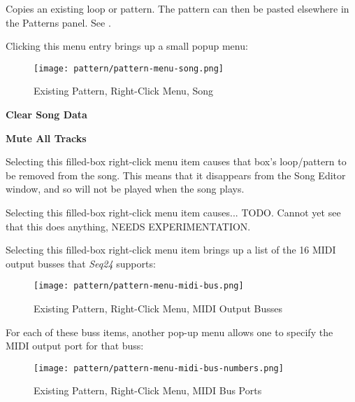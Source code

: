    Copies an existing loop or pattern.
   The pattern can then be pasted elsewhere in the Patterns panel.
   See .

   Clicking this menu entry brings up a small popup menu:

\begin{figure}[H]
   \centering 
   \texttt{[image: pattern/pattern-menu-song.png]}
   \caption{Existing Pattern, Right-Click Menu, Song}
   \label{fig:pattern_window_right_click_song}
\end{figure}

   \begin{enumber}
      \item \textbf{Clear Song Data}
      \item \textbf{Mute All Tracks}
   \end{enumber}

   \setcounter{ItemCounter}{0}      %

   Selecting this filled-box right-click menu item causes that box's
   loop/pattern to be removed from the song.  This means
   that it disappears from the Song Editor window, and so will not
   be played when the song plays.

   Selecting this filled-box right-click menu item causes...
   TODO.  
   Cannot yet see that this does anything, NEEDS EXPERIMENTATION.

   Selecting this filled-box right-click menu item brings up a list
   of the 16 MIDI output busses that \textsl{Seq24} supports:

\begin{figure}[H]
   \centering 
   \texttt{[image: pattern/pattern-menu-midi-bus.png]}
   \caption{Existing Pattern, Right-Click Menu, MIDI Output Busses}
   \label{fig:pattern_window_right_click_midi_bus}
\end{figure}

   For each of these buss items, another pop-up menu allows one
   to specify the MIDI output port for that buss:

\begin{figure}[H]
   \centering 
   \texttt{[image: pattern/pattern-menu-midi-bus-numbers.png]}
   \caption{Existing Pattern, Right-Click Menu, MIDI Bus Ports}
   \label{fig:pattern_window_right_click_midi_bus_numbers}
\end{figure}


